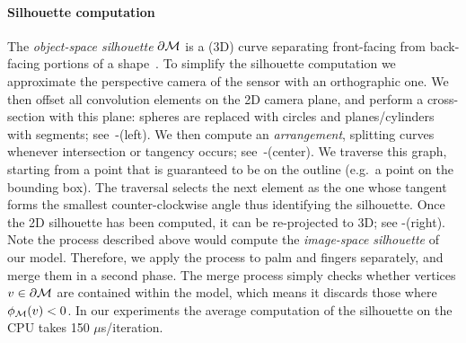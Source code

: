 \paragraph{Silhouette computation}
The \emph{object-space silhouette} $\partial \mathcal{M}$ is a (3D) curve separating front-facing from back-facing portions of a shape~\cite[Sec.1]{olson2006eg}. 
To simplify the silhouette computation we approximate the perspective camera of the sensor with an orthographic one. 
We then offset all convolution elements on the 2D camera plane, and perform a cross-section with this plane: spheres are replaced with circles and planes/cylinders with segments; see~-(left). 
We then compute an \emph{arrangement}, splitting curves whenever intersection or tangency occurs; see~-(center). 
We traverse this graph, starting from a point that is guaranteed to be on the outline (e.g.\ a point on the bounding box). 
The traversal selects the next element as the one whose tangent forms the smallest counter-clockwise angle thus identifying the silhouette. Once the 2D silhouette has been computed, it can be re-projected to 3D; see -(right). 
Note the process described above would compute the \emph{image-space silhouette} of our model. 
Therefore, we apply the process to palm and fingers separately, and merge them in a second phase. 
The merge process simply checks whether vertices $v \in \partial \mathcal{M}$ are contained within the model, which means it discards those where $\phi_{\mathcal{M}}(v)<0$. 
In our experiments the average computation of the silhouette on the CPU takes 150 $\mu$s/iteration.



